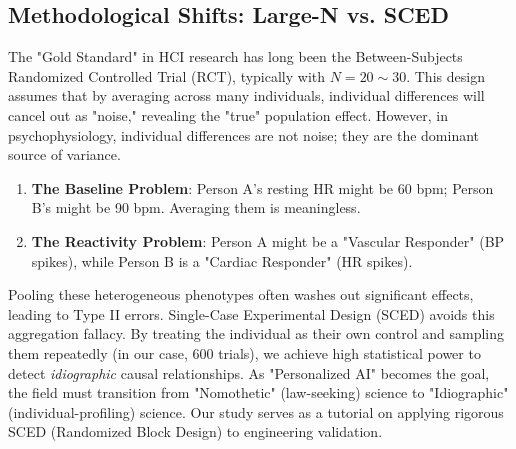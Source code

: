 \documentclass[journal]{IEEEtran}
\begin{document}
\subsection{Methodological Shifts: Large-N vs. SCED}
The "Gold Standard" in HCI research has long been the Between-Subjects Randomized Controlled Trial (RCT), typically with $N=20 \sim 30$. This design assumes that by averaging across many individuals, individual differences will cancel out as "noise," revealing the "true" population effect.
However, in psychophysiology, individual differences are not noise; they are the dominant source of variance.
\begin{enumerate}
    \item \textbf{The Baseline Problem}: Person A's resting HR might be 60 bpm; Person B's might be 90 bpm. Averaging them is meaningless.
    \item \textbf{The Reactivity Problem}: Person A might be a "Vascular Responder" (BP spikes), while Person B is a "Cardiac Responder" (HR spikes).
\end{enumerate}
Pooling these heterogeneous phenotypes often washes out significant effects, leading to Type II errors.
Single-Case Experimental Design (SCED) \cite{barlow_sced} avoids this aggregation fallacy. By treating the individual as their own control and sampling them repeatedly (in our case, 600 trials), we achieve high statistical power to detect \textit{idiographic} causal relationships.
As "Personalized AI" becomes the goal, the field must transition from "Nomothetic" (law-seeking) science to "Idiographic" (individual-profiling) science. Our study serves as a tutorial on applying rigorous SCED (Randomized Block Design) to engineering validation.
\end{document}
